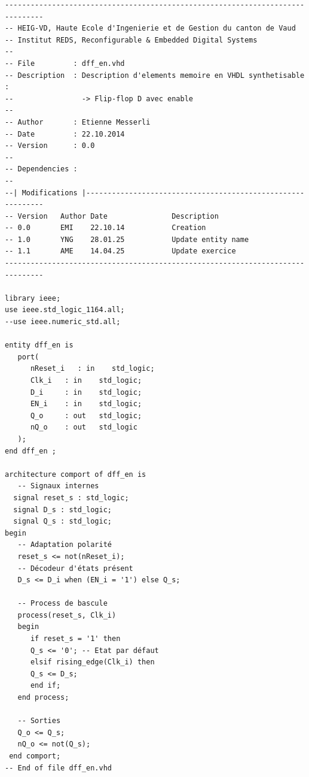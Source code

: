 \begin{verbatim}
-------------------------------------------------------------------------------
-- HEIG-VD, Haute Ecole d'Ingenierie et de Gestion du canton de Vaud
-- Institut REDS, Reconfigurable & Embedded Digital Systems
--
-- File         : dff_en.vhd
-- Description  : Description d'elements memoire en VHDL synthetisable :
--                -> Flip-flop D avec enable
--
-- Author       : Etienne Messerli
-- Date         : 22.10.2014
-- Version      : 0.0
--
-- Dependencies : 
--
--| Modifications |------------------------------------------------------------
-- Version   Author Date               Description
-- 0.0       EMI    22.10.14           Creation
-- 1.0       YNG    28.01.25           Update entity name
-- 1.1       AME    14.04.25           Update exercice
-------------------------------------------------------------------------------

library ieee;
use ieee.std_logic_1164.all;
--use ieee.numeric_std.all;

entity dff_en is
   port( 
      nReset_i   : in    std_logic;
      Clk_i   : in    std_logic;
      D_i     : in    std_logic;
      EN_i    : in    std_logic;
      Q_o     : out   std_logic;
      nQ_o    : out   std_logic
   );
end dff_en ;

architecture comport of dff_en is
   -- Signaux internes 
  signal reset_s : std_logic;
  signal D_s : std_logic; 
  signal Q_s : std_logic;
begin
   -- Adaptation polarité
   reset_s <= not(nReset_i);
   -- Décodeur d'états présent
   D_s <= D_i when (EN_i = '1') else Q_s;
  
   -- Process de bascule
   process(reset_s, Clk_i)
   begin
      if reset_s = '1' then
      Q_s <= '0'; -- Etat par défaut
      elsif rising_edge(Clk_i) then
      Q_s <= D_s;
      end if;
   end process;
 
   -- Sorties
   Q_o <= Q_s;
   nQ_o <= not(Q_s);
 end comport;
-- End of file dff_en.vhd
\end{verbatim}
\newpage
